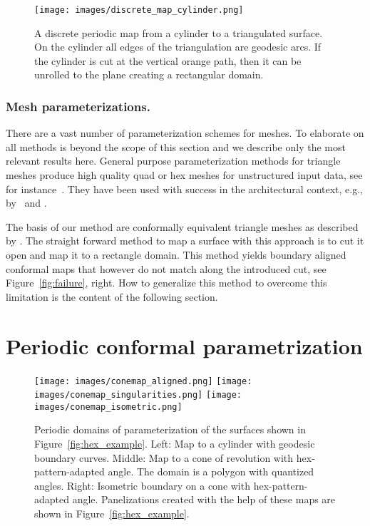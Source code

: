 \documentclass[Thesis.tex]{subfiles}
\begin{document}
\begin{figure}[tb]
\centering
\texttt{[image: images/discrete\_map\_cylinder.png]}
\caption{A discrete periodic map from a cylinder to a triangulated
  surface.  On the cylinder all edges of the triangulation are
  geodesic arcs. If the cylinder is cut at the vertical orange path,
  then it can be unrolled to the plane creating a rectangular domain.}
\label{fig:discrete_map}
\end{figure}

\subsubsection{Mesh parameterizations.}
There are a vast number of parameterization schemes for meshes. To
elaborate on all methods is beyond the scope of this section and we
describe only the most relevant results here. General purpose
parameterization methods for triangle meshes produce high quality quad
or hex meshes for unstructured input data, see for
instance~\cite{BommesZK2009, AlexaCL2000, Springborn2008}. They have been used with
success in the architectural context, e.g., by~\cite{BoPKWW2011} and
\cite{Sechelmann2012}.

The basis of our method are conformally equivalent triangle meshes as
described by \cite{Springborn2008}. The straight forward method to map a
surface with this approach is to cut it open and map it to a rectangle
domain. This method yields boundary aligned conformal maps that
however do not match along the introduced cut, see
Figure~\ref{fig:failure}, right. How to generalize this method to
overcome this limitation is the content of the following section.


\section{Periodic conformal parametrization}
\label{sec:conformal-parameterization}

\begin{figure}[tb]
  \centering
  \texttt{[image: images/conemap\_aligned.png]}
  \texttt{[image: images/conemap\_singularities.png]}
  \texttt{[image: images/conemap\_isometric.png]}
  \caption{Periodic domains of parameterization of the surfaces shown
    in Figure~\ref{fig:hex_example}.  Left: Map to a cylinder with
    geodesic boundary curves. Middle: Map to a cone of revolution with
    hex-pattern-adapted angle. The domain is a polygon with quantized
    angles. Right: Isometric boundary on a cone with
    hex-pattern-adapted angle.  Panelizations created with the help of
    these maps are shown in Figure~\ref{fig:hex_example}.}
  \label{fig:cone_maps_teaser}
\end{figure}
\end{document}
